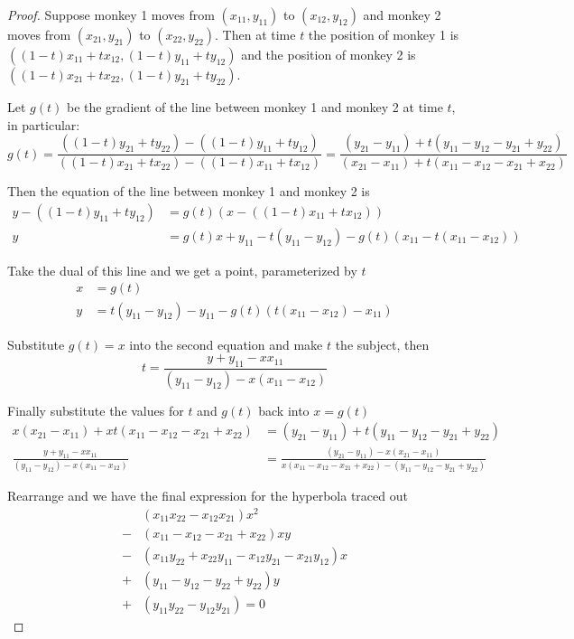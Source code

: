 \documentclass{article}
\begin{document}
\begin{proof}
  Suppose monkey 1 moves from $(x_{11}, y_{11})$ to $(x_{12}, y_{12})$ and monkey 2 moves from $(x_{21}, y_{21})$ to $(x_{22}, y_{22})$. Then at time $t$ the position of monkey 1 is $((1-t) x_{11} + t x_{12}, (1-t) y_{11} + t y_{12})$ and the position of monkey 2 is $((1-t) x_{21} + t x_{22}, (1-t) y_{21} + t y_{22})$.

  Let $g(t)$ be the gradient of the line between monkey 1 and monkey 2 at time $t$, in particular:
  \[
    g(t) = \frac{((1-t) y_{21} + t y_{22}) - ((1-t) y_{11} + t y_{12})}{((1-t) x_{21} + t x_{22}) - ((1-t) x_{11} + t x_{12})}
    = \frac{(y_{21} - y_{11}) + t(y_{11} - y_{12} - y_{21} + y_{22})}{(x_{21} - x_{11}) + t(x_{11} - x_{12} - x_{21} + x_{22})}
  \]

  Then the equation of the line between monkey 1 and monkey 2 is
  \begin{align*}
    y - ((1-t) y_{11} + t y_{12}) &= g(t) (x - ((1-t) x_{11} + t x_{12})) \\
    y &= g(t) x + y_{11} - t(y_{11} - y_{12}) - g(t)(x_{11} - t(x_{11} - x_{12}))
  \end{align*}

  Take the dual of this line and we get a point, parameterized by $t$
  \begin{align*}
    x &= g(t) \\
    y &= t(y_{11} - y_{12}) - y_{11} - g(t)(t(x_{11} - x_{12}) - x_{11})
  \end{align*}

  Substitute $g(t)=x$ into the second equation and make $t$ the subject, then
  \[
    t = \frac{y + y_{11} - x x_{11}}{(y_{11} - y_{12}) - x(x_{11} - x_{12})}
  \]

  Finally substitute the values for $t$ and $g(t)$ back into $x = g(t)$
  \begin{align*}
    x(x_{21} - x_{11}) + x t (x_{11} - x_{12} - x_{21} + x_{22}) &= (y_{21} - y_{11}) + t(y_{11} - y_{12} - y_{21} + y_{22}) \\
    \frac{y + y_{11} - x x_{11}}{(y_{11} - y_{12}) - x(x_{11} - x_{12})}
    &= \frac{(y_{21} - y_{11}) - x(x_{21} - x_{11})}{x(x_{11} - x_{12} - x_{21} + x_{22}) - (y_{11} - y_{12} - y_{21} + y_{22})}
  \end{align*}

  Rearrange and we have the final expression for the hyperbola traced out
  \begin{align*}
    &(x_{11} x_{22} - x_{12} x_{21}) x^2 \\
    - &(x_{11} - x_{12} - x_{21} + x_{22}) x y \\
    - &(x_{11} y_{22} + x_{22} y_{11} - x_{12} y_{21} - x_{21} y_{12})x \\
    + &(y_{11} - y_{12} - y_{22} + y_{22}) y \\
    + &(y_{11} y_{22} - y_{12} y_{21}) = 0
  \end{align*}
\end{proof}
\end{document}
